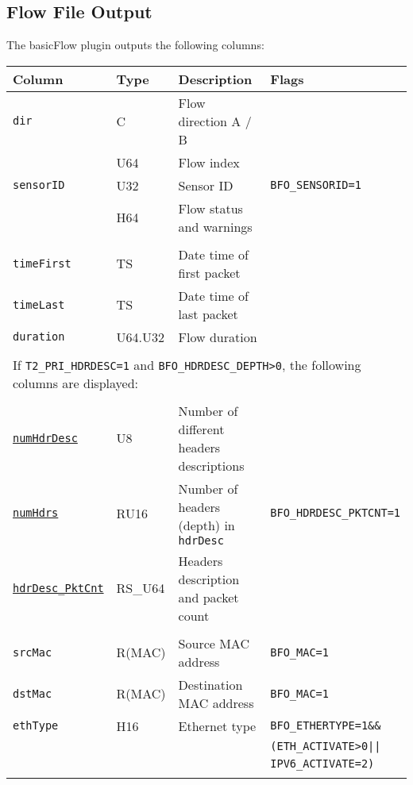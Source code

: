 \documentclass[documentation]{subfiles}
\begin{document}
\subsection{Flow File Output}
The basicFlow plugin outputs the following columns:
\begin{longtable}{llll}
    \toprule
    {\bf Column} & {\bf Type} & {\bf Description} & {\bf Flags}\\
    \midrule\endhead%
    {\tt dir}                & C   & Flow direction A / B     & \\
    {\tt \nameref{flowInd}}  & U64 & Flow index               & \\
    {\tt sensorID}           & U32 & Sensor ID                & {\tt\small BFO\_SENSORID=1}\\
    {\tt \nameref{flowStat}} & H64 & Flow status and warnings & \\\\

    {\tt timeFirst} & TS      & Date time of first packet\\
    {\tt timeLast}  & TS      & Date time of last packet\\
    {\tt duration}  & U64.U32 & Flow duration \\\\

    \multicolumn{4}{l}{If {\tt T2\_PRI\_HDRDESC=1} and {\tt BFO\_HDRDESC\_DEPTH>0}, the following columns are displayed:}\\\\

    {\tt \hyperref[hdrDesc]{numHdrDesc}}      & U8      & Number of different headers descriptions \\
    {\tt \hyperref[hdrDesc]{numHdrs}}         & RU16    & Number of headers (depth) in {\tt hdrDesc} & {\tt\small BFO\_HDRDESC\_PKTCNT=1}\\
    {\tt \hyperref[hdrDesc]{hdrDesc\_PktCnt}} & RS\_U64 & Headers description and packet count \\\\

    {\tt srcMac}  & R(MAC) & Source MAC address      & {\tt\small BFO\_MAC=1}\\
    {\tt dstMac}  & R(MAC) & Destination MAC address & {\tt\small BFO\_MAC=1}\\
    {\tt ethType} & H16    & Ethernet type           & {\tt\small BFO\_ETHERTYPE=1\&\&}\\
                  &        &                         & {\tt\small (ETH\_ACTIVATE>0||}\\
                  &        &                         & {\tt\small IPV6\_ACTIVATE=2)}\\\\


\end{longtable}
\end{document}
